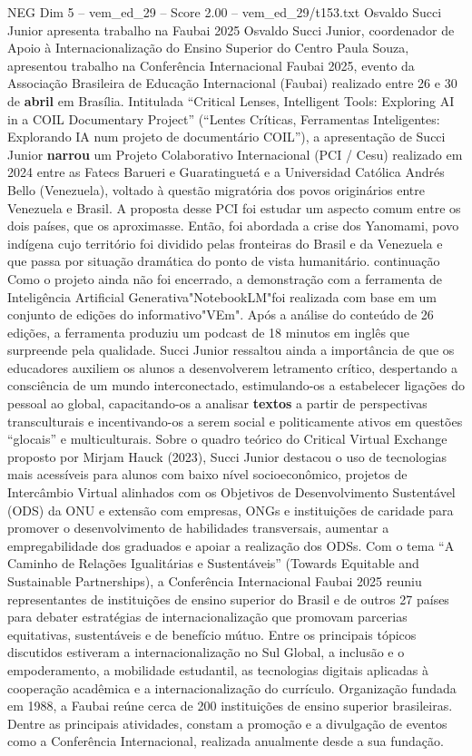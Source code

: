 \begin{textsample}{NEG Dim 5 – vem\_ed\_29 – Score 2.00 – vem\_ed\_29/t153.txt}  \label{ex:f5_neg_127}
Osvaldo Succi Junior apresenta trabalho na Faubai 2025 Osvaldo Succi Junior, coordenador de Apoio à Internacionalização do Ensino Superior do Centro Paula Souza, apresentou trabalho na Conferência Internacional Faubai 2025, evento da Associação Brasileira de Educação Internacional (Faubai) realizado entre 26 e 30 de \textbf{abril} em Brasília.
Intitulada “Critical Lenses, Intelligent Tools: Exploring AI in a COIL Documentary Project” (“Lentes Críticas, Ferramentas Inteligentes: Explorando IA num projeto de documentário COIL”), a apresentação de Succi Junior \textbf{narrou} um Projeto Colaborativo Internacional (PCI / Cesu) realizado em 2024 entre as Fatecs Barueri e Guaratinguetá e a Universidad Católica Andrés Bello (Venezuela), voltado à questão migratória dos povos originários entre Venezuela e Brasil.
A proposta desse PCI foi estudar um aspecto comum entre os dois países, que os aproximasse.
Então, foi abordada a crise dos Yanomami, povo indígena cujo território foi dividido pelas fronteiras do Brasil e da Venezuela e que passa por situação dramática do ponto de vista humanitário. continuação Como o projeto ainda não foi encerrado, a demonstração com a ferramenta de Inteligência Artificial Generativa"NotebookLM"foi realizada com base em um conjunto de edições do informativo"VEm".
Após a análise do conteúdo de 26 edições, a ferramenta produziu um podcast de 18 minutos em inglês que surpreende pela qualidade.
Succi Junior ressaltou ainda a importância de que os educadores auxiliem os alunos a desenvolverem letramento crítico, despertando a consciência de um mundo interconectado, estimulando-os a estabelecer ligações do pessoal ao global, capacitando-os a analisar \textbf{textos} a partir de perspectivas transculturais e incentivando-os a serem social e politicamente ativos em questões “glocais” e multiculturais.
Sobre o quadro teórico do Critical Virtual Exchange proposto por Mirjam Hauck (2023), Succi Junior destacou o uso de tecnologias mais acessíveis para alunos com baixo nível socioeconômico, projetos de Intercâmbio Virtual alinhados com os Objetivos de Desenvolvimento Sustentável (ODS) da ONU e extensão com empresas, ONGs e instituições de caridade para promover o desenvolvimento de habilidades transversais, aumentar a empregabilidade dos graduados e apoiar a realização dos ODSs.
Com o tema “A Caminho de Relações Igualitárias e Sustentáveis” (Towards Equitable and Sustainable Partnerships), a Conferência Internacional Faubai 2025 reuniu representantes de instituições de ensino superior do Brasil e de outros 27 países para debater estratégias de internacionalização que promovam parcerias equitativas, sustentáveis e de benefício mútuo.
Entre os principais tópicos discutidos estiveram a internacionalização no Sul Global, a inclusão e o empoderamento, a mobilidade estudantil, as tecnologias digitais aplicadas à cooperação acadêmica e a internacionalização do currículo.
Organização fundada em 1988, a Faubai reúne cerca de 200 instituições de ensino superior brasileiras.
Dentre as principais atividades, constam a promoção e a divulgação de eventos como a Conferência Internacional, realizada anualmente desde a sua fundação.

\end{textsample}
